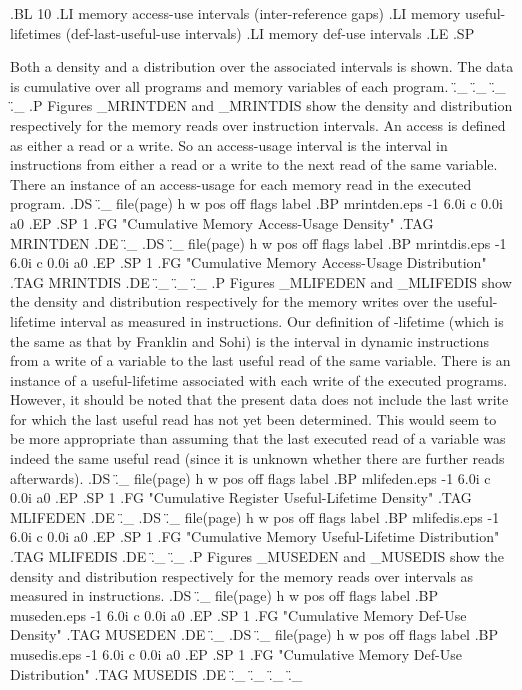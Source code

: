 \documentclass[10pt,twocolumn]{article}
\begin{document}
.BL 10
.LI
memory access-use intervals (inter-reference gaps)
.LI
memory useful-lifetimes (def-last-useful-use intervals)
.LI
memory def-use intervals
.LE
.SP


Both a density and a distribution over the
associated intervals is shown.
The data is cumulative over all programs and memory variables
of each program.
.\"_
.\"_
.\"_
.\"_
.P
Figures \_MRINTDEN and \_MRINTDIS show the density and distribution
respectively for the memory reads over instruction intervals.
An access is defined as either a read or a write.
So an access-usage interval is the interval in instructions
from either a read or a write to the next read of the same
variable.  
There an instance of an access-usage for each memory
read in the executed program.
.DS
.\"_ file(page) h w pos off flags label
.BP mrintden.eps -1 6.0i c 0.0i a0
.EP
.SP 1
.FG "Cumulative Memory Access-Usage Density"
.TAG MRINTDEN
.DE
.\"_
.DS
.\"_ file(page) h w pos off flags label
.BP mrintdis.eps -1 6.0i c 0.0i a0
.EP
.SP 1
.FG "Cumulative Memory Access-Usage Distribution"
.TAG MRINTDIS
.DE
.\"_
.\"_
.\"_
.P
Figures \_MLIFEDEN and \_MLIFEDIS show the density and distribution
respectively for the memory writes over the useful-lifetime interval
as measured in instructions.
Our definition of \fIUseful-lifetime\fP 
(which is the same as that by Franklin and Sohi)
is the interval in dynamic instructions from a write of a variable
to the last useful read of the same variable.
There is an instance of a useful-lifetime associated with
each write of the executed programs.  However, it should be noted
that the present data does not include the last write for which
the last useful read has not yet been determined. 
This would seem to be more appropriate than assuming that the
last executed read of a variable was indeed the same useful read (since
it is unknown whether there are further reads afterwards).
.DS
.\"_ file(page) h w pos off flags label
.BP mlifeden.eps -1 6.0i c 0.0i a0
.EP
.SP 1
.FG "Cumulative Register Useful-Lifetime Density"
.TAG MLIFEDEN
.DE
.\"_
.DS
.\"_ file(page) h w pos off flags label
.BP mlifedis.eps -1 6.0i c 0.0i a0
.EP
.SP 1
.FG "Cumulative Memory Useful-Lifetime Distribution"
.TAG MLIFEDIS
.DE
.\"_
.\"_
.P
Figures \_MUSEDEN and \_MUSEDIS show the density and distribution
respectively for the memory reads over
intervals
as measured in instructions.
.DS
.\"_ file(page) h w pos off flags label
.BP museden.eps -1 6.0i c 0.0i a0
.EP
.SP 1
.FG "Cumulative Memory Def-Use Density"
.TAG MUSEDEN
.DE
.\"_
.DS
.\"_ file(page) h w pos off flags label
.BP musedis.eps -1 6.0i c 0.0i a0
.EP
.SP 1
.FG "Cumulative Memory Def-Use Distribution"
.TAG MUSEDIS
.DE
.\"_
.\"_
.\"_
.\"_
\end{document}
